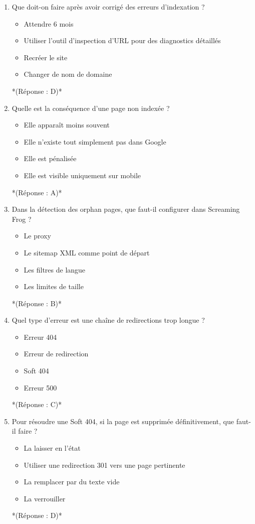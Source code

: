 \documentclass[12pt,a4paper,twoside]{report}
\begin{document}
\begin{enumerate}
\item Que doit-on faire après avoir corrigé des erreurs d'indexation ?
\begin{itemize}
\item[A)] Attendre 6 mois
\item[B)] Utiliser l'outil d'inspection d'URL pour des diagnostics détaillés
\item[C)] Recréer le site
\item[D)] Changer de nom de domaine
\end{itemize}
*(Réponse : D)*

\item Quelle est la conséquence d'une page non indexée ?
\begin{itemize}
\item[A)] Elle apparaît moins souvent
\item[B)] Elle n'existe tout simplement pas dans Google
\item[C)] Elle est pénalisée
\item[D)] Elle est visible uniquement sur mobile
\end{itemize}
*(Réponse : A)*

\item Dans la détection des orphan pages, que faut-il configurer dans Screaming Frog ?
\begin{itemize}
\item[A)] Le proxy
\item[B)] Le sitemap XML comme point de départ
\item[C)] Les filtres de langue
\item[D)] Les limites de taille
\end{itemize}
*(Réponse : B)*

\item Quel type d'erreur est une chaîne de redirections trop longue ?
\begin{itemize}
\item[A)] Erreur 404
\item[B)] Erreur de redirection
\item[C)] Soft 404
\item[D)] Erreur 500
\end{itemize}
*(Réponse : C)*

\item Pour résoudre une Soft 404, si la page est supprimée définitivement, que faut-il faire ?
\begin{itemize}
\item[A)] La laisser en l'état
\item[B)] Utiliser une redirection 301 vers une page pertinente
\item[C)] La remplacer par du texte vide
\item[D)] La verrouiller
\end{itemize}
*(Réponse : D)*


\end{enumerate}
\end{document}
